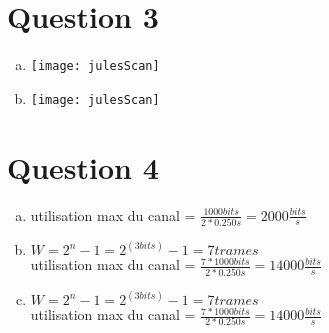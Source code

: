 \section{Question 3}

\begin{enumerate}[(a)]
	\item
		\parbox{\linewidth}{\centering
		\texttt{[image: julesScan]}
		}
	\item
		\parbox{\linewidth}{\centering
		\texttt{[image: julesScan]}
		}
\end{enumerate}


\section{Question 4}
\begin{enumerate}[(a)]
	\item 
		utilisation max du canal = $\frac{1000 bits}{2 * 0.250s} = 2000\frac{bits}{s}$
	\item
		$W = 2^n-1 = 2^(3bits)-1 = 7 trames$\\
		utilisation max du canal = $\frac{7 * 1000 bits}{2 * 0.250s} = 14000\frac{bits}{s}$
	\item
		$W = 2^n-1 = 2^(3bits)-1 = 7 trames$\\
		utilisation max du canal = $\frac{7 * 1000 bits}{2 * 0.250s} = 14000\frac{bits}{s}$
\end{enumerate}

